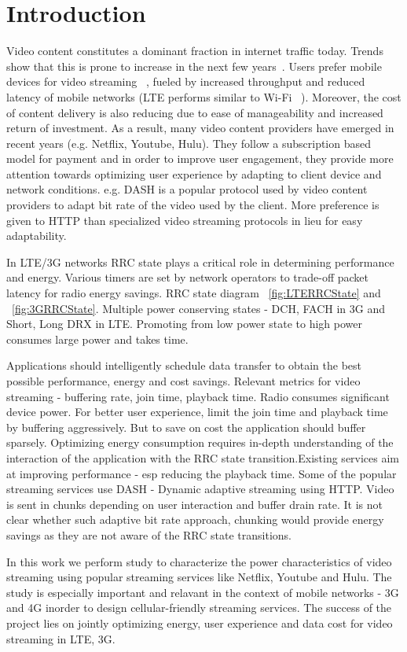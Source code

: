 \section{Introduction}
Video content constitutes a dominant fraction in internet traffic today. Trends show that this is prone to increase in the next few years~\cite{}.
Users prefer mobile devices for video streaming ~\cite{}, fueled by increased throughput and reduced latency of mobile networks (LTE performs similar to Wi-Fi ~\cite{LTEPaper}).
Moreover, the cost of content delivery is also reducing due to ease of manageability and increased return of investment. As a result, many video content providers have emerged in recent years (e.g. Netflix, Youtube, Hulu). 
They follow a subscription based model for payment and in order to improve user engagement, they provide more attention towards optimizing user experience by adapting to client device and network conditions. e.g. DASH is a popular protocol used by video content providers to adapt bit rate of the video used by the client. 
More preference is given to HTTP than specialized video streaming protocols in lieu for easy adaptability.  

 
In LTE/3G networks RRC state plays a critical role in determining performance and energy. Various timers are set by network operators to trade-off packet latency for radio energy savings. RRC state diagram ~\ref{fig:LTERRCState} and ~\ref{fig:3GRRCState}. Multiple power conserving states - DCH, FACH in 3G and Short, Long DRX in LTE. Promoting from low power state to high power consumes large power and takes time.    

Applications should intelligently schedule data transfer to obtain the best possible performance, energy and cost savings. Relevant metrics for video streaming - buffering rate, join time, playback time. Radio consumes significant device power. For better user experience, limit the join time and playback time by buffering aggressively. But to save on cost the application should buffer sparsely. Optimizing energy consumption requires in-depth understanding of the interaction of the application with the RRC state transition.Existing services aim at improving performance - esp reducing the playback time. Some of the popular streaming services use DASH - Dynamic adaptive streaming using HTTP. Video is sent in chunks depending on user interaction and buffer drain rate. It is not clear whether such adaptive bit rate approach, chunking would provide energy savings as they are not aware of the RRC state transitions.           

In this work we perform study to characterize the power characteristics of video streaming using popular streaming services like Netflix, Youtube and Hulu. The study is especially important and relavant in the context of mobile networks - 3G and 4G inorder to design cellular-friendly streaming services. The success of the project lies on jointly optimizing energy, user experience and data cost for video streaming in LTE, 3G.      
